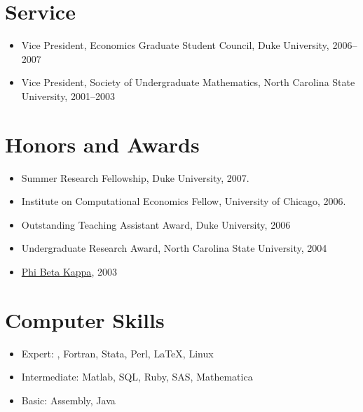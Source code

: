 \documentclass[overlapped,line,letterpaper]{res}
\begin{document}
\begin{resume}

%


\section{\bf Service}

\begin{itemize}
\item Vice President, Economics Graduate Student Council, Duke University,
  2006--2007
\item Vice President, Society of Undergraduate Mathematics, North Carolina
  State University, 2001--2003
\end{itemize}


\section{\bf Honors and Awards}
\begin{itemize}
\item Summer Research Fellowship, Duke University, 2007.
\item Institute on Computational Economics Fellow, University of Chicago, 2006.
\item Outstanding Teaching Assistant Award, Duke University, 2006
\item Undergraduate Research Award, North Carolina State University, 2004
\item \href{http://www.pbk.org/}{Phi Beta Kappa}, 2003
\end{itemize}

\section{\bf Computer Skills}

\begin{itemize}
\item Expert: \Cplusplus, Fortran, Stata, Perl, \LaTeX, Linux
\item Intermediate: Matlab, SQL, Ruby, SAS, Mathematica
\item Basic: Assembly, Java
\end{itemize}


\end{resume}
\end{document}
